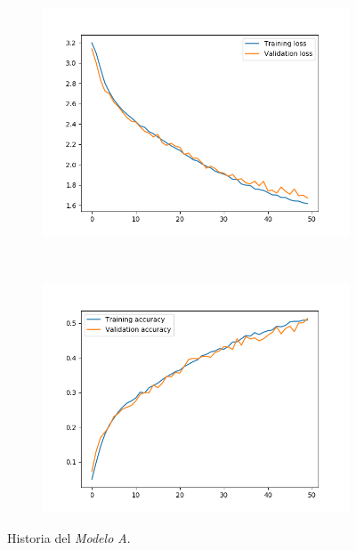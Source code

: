 \documentclass[11pt,a4paper]{article}
\begin{document}
\begin{figure}[H]
  \centering
  \begin{subfigure}{.5\textwidth}
    \centering
    \includegraphics[scale=0.38]{img/deep1-aug-loss.png}
    \label{fig:deep1-aug-loss}
  \end{subfigure}%
  ~ \quad
  \begin{subfigure}{.5\textwidth}
    \centering
    \includegraphics[scale=0.38]{img/deep1-aug-acc.png}
    \label{fig:deep1-aug-acc}
  \end{subfigure}
  \caption{Historia del \textit{Modelo A}.}
  \label{fig:deep1-aug}
\end{figure}
\end{document}

